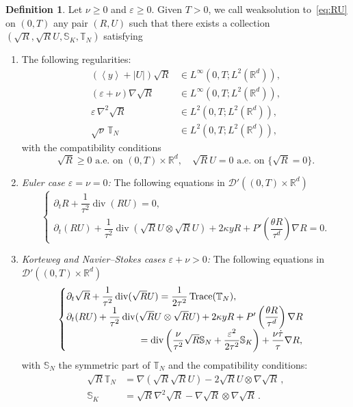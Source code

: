 \documentclass[11pt]{article}
\theoremstyle{definition}
\newtheorem{defi}[theo]{Definition}
\numberwithin{equation}{section}
\numberwithin{figure}{section}
\numberwithin{table}{section}
\DeclareMathOperator{\DIV}{div}
\DeclareMathOperator{\Trace}{Trace}
\newcommand*\R{\mathbb{R}}
\newcommand*\<{\left\langle}
\renewcommand*\>{\right\rangle}
\renewcommand*\ge{\geqslant}
\newcommand*\eps{\varepsilon}
\begin{document}
\begin{defi}\label{def_weaksol}
Let $\nu \ge 0$ and $\varepsilon \ge 0.$ Given $T >0$, we call weak\linebreak solution to~\eqref{eq:RU} on $(0,T)$ any pair $(R,U)$ such that there exists a collection\linebreak $(\sqrt{R},\sqrt{R}U,\mathbb S_{K},\mathbb T_{N})$ satisfying
\begin{enumerate}
\item \label{2.6.1} The following regularities:
\begin{align*}
\left(\<y\>+|U|\right) \sqrt{R} &\in L^{\infty}\left(0,T; L^2 (\R^d)\right),\\
(\eps+\nu)\nabla \sqrt R &\in L^{\infty}\left(0,T; L^2 (\R^d)\right),\\
\varepsilon \, \nabla^2 \sqrt{R} &\in L^2(0,T;L^2(\mathbb R^d)),\\
\sqrt \nu \, \mathbb T_N &\in L^2(0,T; L^2(\mathbb R^d)),
\end{align*}
with the compatibility conditions
\[
\sqrt{R} \ge 0 \text{ a.e. on } (0,T)\times \R^d, \quad \sqrt{R}U= 0 \text{ a.e. on } \{\sqrt{R} = 0 \}.
\]

\item \label{2.6.2} \emph{Euler case $\eps=\nu=0$:} The following equations in $\mathcal D'((0,T)\times \mathbb R^d)$
\begin{equation}\label{eq:NSKrevu-euler}
\begin{cases}
\partial_t{R}+\dfrac{1}{\tau^2}\DIV ({R} U)= 0,\\
\partial_t ({R}U) +\dfrac{1}{\tau^2}\DIV (\sqrt{R}U \otimes \sqrt{R}U) +2\kappa y R + P'\left(\dfrac{\theta R}{\tau^d}\right)\nabla R =0.
\end{cases}
\end{equation}

\item \label{2.6.3} \emph{Korteweg and Navier--Stokes cases $\eps + \nu > 0$:} The following equations in $\mathcal D'((0,T)\times \mathbb R^d)$
\begin{equation}\label{eq:NSKrevu}
\begin{cases}
\partial_t\sqrt{R}+\dfrac{1}{\tau^2}\DIV(\sqrt{R}U)=\dfrac{1}{2\tau^2}\Trace(\mathbb T_N),\\
\partial_t ({R}U) +\dfrac{1}{\tau^2}\DIV (\sqrt{R}U \otimes \sqrt{R}U) +2\kappa y R + P'\left(\dfrac{\theta R}{\tau^d}\right)\nabla R\\
\mkern 140mu =\DIV \left(\dfrac{\nu}{\tau^2} \sqrt R \mathbb S_N + \dfrac{\varepsilon^2}{2\tau^2} \mathbb S_K\right) + \dfrac{\nu \dot{\tau}}{\tau} \nabla R,
\end{cases}
\end{equation}
with $\mathbb S_N$ the symmetric part of $\mathbb T_N$ and the compatibility conditions:
\begin{align}\label{eq_compnewton}
\sqrt{R}\mathbb T_{N} &= \nabla(\sqrt{R} \sqrt{R} U) - 2 \sqrt{R}U \otimes \nabla \sqrt{R}\,, \\
\mathbb S_K &=\sqrt{R}\nabla^2 \sqrt{R} - \nabla \sqrt{R} \otimes \nabla \sqrt{R}
\,. \label{eq_compkorteweg}
\end{align}
\end{enumerate}
\end{defi}
\end{document}
